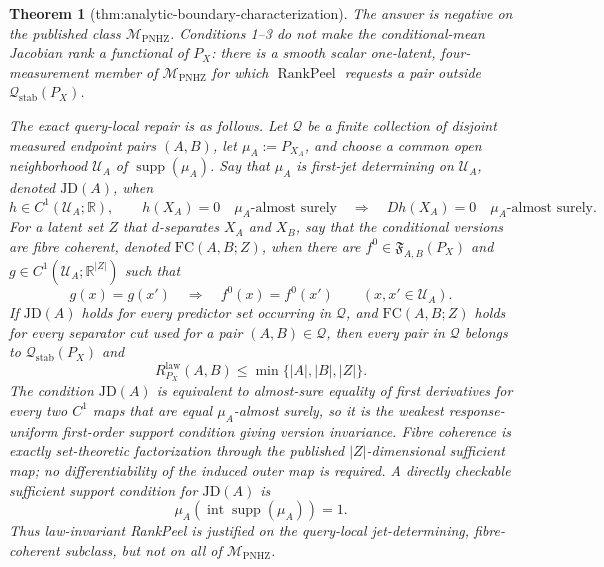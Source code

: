\documentclass{article}
\newtheorem{theorem}{Theorem}
\begin{document}
\begin{theorem}[thm:analytic-boundary-characterization]\label{thm:analytic-boundary-characterization}
The answer is negative on the published class \(\mathcal M_{\mathrm{PNHZ}}\).  Conditions 1--3 do not make the conditional-mean Jacobian rank a functional of \(P_X\): there is a smooth scalar one-latent, four-measurement member of \(\mathcal M_{\mathrm{PNHZ}}\) for which \(\operatorname{RankPeel}\) requests a pair outside \(\mathcal Q_{\mathrm{stab}}(P_X)\).

The exact query-local repair is as follows.  Let \(\mathscr Q\) be a finite collection of disjoint measured endpoint pairs \((A,B)\), let \(\mu_A:=P_{X_A}\), and choose a common open neighborhood \(\mathcal U_A\) of \(\operatorname{supp}(\mu_A)\).  Say that \(\mu_A\) is first-jet determining on \(\mathcal U_A\), denoted \(\mathrm{JD}(A)\), when
\[
 h\in C^1(\mathcal U_A;\mathbb R),\qquad h(X_A)=0\quad\mu_A\text{-almost surely}
 \quad\Longrightarrow\quad
 Dh(X_A)=0\quad\mu_A\text{-almost surely}.
\]
For a latent set \(Z\) that \(d\)-separates \(X_A\) and \(X_B\), say that the conditional versions are fibre coherent, denoted \(\mathrm{FC}(A,B;Z)\), when there are \(f^0\in\mathfrak F_{A,B}(P_X)\) and \(g\in C^1(\mathcal U_A;\mathbb R^{|Z|})\) such that
\[
 g(x)=g(x')\quad\Longrightarrow\quad f^0(x)=f^0(x')
 \qquad(x,x'\in\mathcal U_A).
\]
If \(\mathrm{JD}(A)\) holds for every predictor set occurring in \(\mathscr Q\), and \(\mathrm{FC}(A,B;Z)\) holds for every separator cut used for a pair \((A,B)\in\mathscr Q\), then every pair in \(\mathscr Q\) belongs to \(\mathcal Q_{\mathrm{stab}}(P_X)\) and
\[
 R^{\mathrm{law}}_{P_X}(A,B)
 \leq \min\{|A|,|B|,|Z|\}.
\]
The condition \(\mathrm{JD}(A)\) is equivalent to almost-sure equality of first derivatives for every two \(C^1\) maps that are equal \(\mu_A\)-almost surely, so it is the weakest response-uniform first-order support condition giving version invariance.  Fibre coherence is exactly set-theoretic factorization through the published \(|Z|\)-dimensional sufficient map; no differentiability of the induced outer map is required.  A directly checkable sufficient support condition for \(\mathrm{JD}(A)\) is
\[
 \mu_A\!\left(\operatorname{int}\operatorname{supp}(\mu_A)\right)=1.
\]
Thus law-invariant RankPeel is justified on the query-local jet-determining, fibre-coherent subclass, but not on all of \(\mathcal M_{\mathrm{PNHZ}}\).
\end{theorem}
\end{document}
